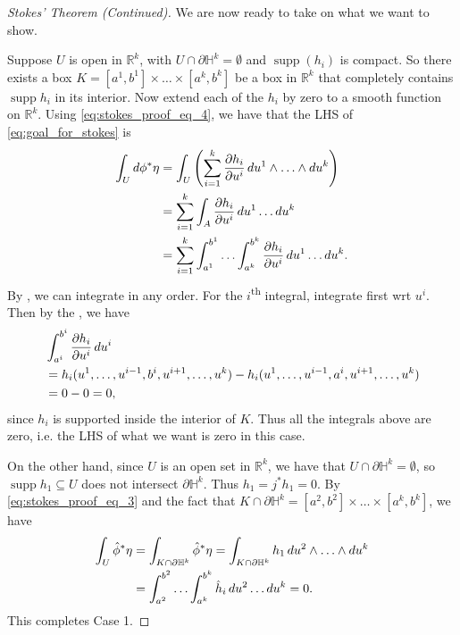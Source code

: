 \documentclass[notoc,notitlepage]{tufte-book}
\DeclareMathOperator{\supp}{supp}
\begin{document}
\begin{proof}[Stokes' Theorem (Continued)]
  We are now ready to take on what we want to show.

  \noindent
   Suppose $U$ is open in $\mathbb{R}^k$, with $U \cap \partial
  \mathbb{H}^k = \emptyset$ and $\supp(h_i)$ is compact. So there exists a box
  $K = [a^1, b^1] \times \hdots \times [a^k, b^k]$ be a box in $\mathbb{R}^k$
  that completely contains $\supp h_i$ in its interior. Now extend each of the
  $h_i$ by zero to a smooth function on $\mathbb{R}^k$. Using
  \cref{eq:stokes_proof_eq_4}, we have that the LHS of \cref{eq:goal_for_stokes}
  is
  \begin{align*}
    \int_{U} \mathop{}\!d{\phi^* \eta}
    &= \int_{U} \left( \sum_{i=1}^{k} \frac{\partial h_i}{\partial u^i}
    \mathop{}\!d{u^1} \land \hdots \land \mathop{}\!d{u^k} \right) \\
    &= \sum_{i=1}^{k} \int_{A} \frac{\partial h_i}{\partial u^i} \mathop{}\!d{u^1}
    \hdots \mathop{}\!d{u^k} \\
    &= \sum_{i=1}^{k} \int_{a^1}^{b^1} \hdots \int_{a^k}^{b^k} \frac{\partial
    h_i}{\partial u^i} \mathop{}\!d{u^1} \hdots \mathop{}\!d{u^k}.
  \end{align*}
  By , we can integrate in any order. For the
  $i$\textsuperscript{th} integral, integrate first wrt $u^i$. Then by the
  , we have
  \begin{align*}
    &\int_{a^i}^{b^i} \frac{\partial h_i}{\partial u^i} \mathop{}\!d{u^i} \\
    &= h_i(u^1, \ldots, u^{i-1}, b^i, u^{i+1}, \ldots, u^k) - h_i(u^1, \ldots,
    u^{i-1}, a^i, u^{i+1}, \ldots, u^k) \\
    &= 0 - 0 = 0,
  \end{align*}
  since $h_i$ is supported inside the interior of $K$. Thus all the integrals
  above are zero, i.e. the LHS of what we want is zero in this case.

  On the other hand, since $U$ is an open set in $\mathbb{R}^k$, we have that $U
  \cap \partial \mathbb{H}^k = \emptyset$, so $\supp h_1 \subseteq U$ does not
  intersect $\partial \mathbb{H}^k$. Thus $h_1 = j^* h_1 = 0$. By
  \cref{eq:stokes_proof_eq_3} and the fact that $K \cap \partial \mathbb{H}^k =
  [a^2, b^2] \times \hdots \times [a^k, b^k]$, we have
  \begin{align*}
    \int_{U} \hat{\phi}^* \eta
    &= \int_{K \cap \partial \mathbb{H}^k} \hat{\phi}^* \eta = \int_{K \cap
    \partial \mathbb{H}^k} h_1 \mathop{}\!d{u^2} \land \hdots \land \mathop{}\!d{u^k} \\
    &= \int_{a^2}^{b^2} \hdots \int_{a^k}^{b^k} \hat{h}_i \mathop{}\!d{u^2} \hdots
    \mathop{}\!d{u^k} = 0.
  \end{align*}
  This completes Case 1.


\end{proof}
\end{document}
